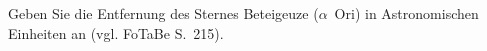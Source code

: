 Geben Sie die Entfernung des Sternes Beteigeuze ($\alpha$~Ori) in Astronomischen Einheiten an (vgl. FoTaBe S.~215).
